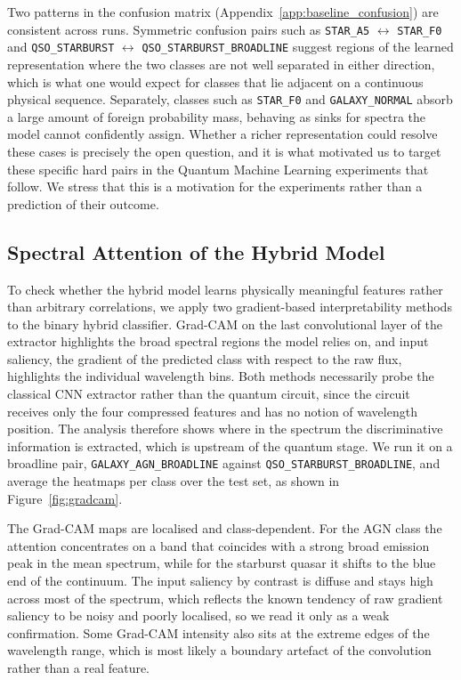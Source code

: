 Two patterns in the confusion matrix (Appendix~\ref{app:baseline_confusion}) are
consistent across runs. Symmetric confusion pairs such as \texttt{STAR\_A5}
$\leftrightarrow$ \texttt{STAR\_F0} and \texttt{QSO\_STARBURST} $\leftrightarrow$
\texttt{QSO\_STARBURST\_BROADLINE} suggest regions of the learned representation
where the two classes are not well separated in either direction, which is what
one would expect for classes that lie adjacent on a continuous physical sequence.
Separately, classes such as \texttt{STAR\_F0} and \texttt{GALAXY\_NORMAL} absorb
a large amount of foreign probability mass, behaving as sinks for spectra the
model cannot confidently assign. Whether a richer representation could resolve
these cases is precisely the open question, and it is what motivated us to target
these specific hard pairs in the Quantum Machine Learning experiments that
follow. We stress that this is a motivation for the experiments rather than a
prediction of their outcome.


\subsection{Spectral Attention of the Hybrid Model}
\label{sec:interpretability}

To check whether the hybrid model learns physically meaningful features rather than
arbitrary correlations, we apply two gradient-based interpretability methods to the
binary hybrid classifier. Grad-CAM on the last convolutional layer of the extractor
highlights the broad spectral regions the model relies on, and input saliency, the
gradient of the predicted class with respect to the raw flux, highlights the
individual wavelength bins. Both methods necessarily probe the classical CNN extractor
rather than the quantum circuit, since the circuit receives only the four compressed
features and has no notion of wavelength position. The analysis therefore shows where
in the spectrum the discriminative information is extracted, which is upstream of the
quantum stage. We run it on a broadline pair, \texttt{GALAXY\_AGN\_BROADLINE} against
\texttt{QSO\_STARBURST\_BROADLINE}, and average the heatmaps per class over the test
set, as shown in Figure~\ref{fig:gradcam}.

The Grad-CAM maps are localised and class-dependent. For the AGN class the attention
concentrates on a band that coincides with a strong broad emission peak in the mean
spectrum, while for the starburst quasar it shifts to the blue end of the continuum.
The input saliency by contrast is diffuse and stays high across most of the spectrum,
which reflects the known tendency of raw gradient saliency to be noisy and poorly
localised, so we read it only as a weak confirmation. Some Grad-CAM intensity also
sits at the extreme edges of the wavelength range, which is most likely a boundary
artefact of the convolution rather than a real feature.

